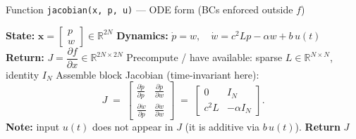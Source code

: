 \documentclass[11pt]{article}
\begin{document}
\begin{algorithm}[h]
\caption{Function \texttt{jacobian(x, p, u)} — ODE form (BCs enforced outside $f$)}
\begin{algorithmic}[1]
\State \textbf{State:} $\mathbf{x}=\begin{bmatrix}p\\ w\end{bmatrix}\in\mathbb{R}^{2N}$ \quad
\textbf{Dynamics:}\quad
$\dot p = w,\quad \dot w = c^2 L p - \alpha w + b\,u(t)$
\State \textbf{Return:} $J=\dfrac{\partial f}{\partial x}\in\mathbb{R}^{2N\times 2N}$
\vspace{4pt}
\State Precompute / have available: sparse $L\in\mathbb{R}^{N\times N}$, identity $I_N$
\State Assemble block Jacobian (time-invariant here):
\[
J \;=\;
\begin{bmatrix}
\frac{\partial \dot p}{\partial p} & \frac{\partial \dot p}{\partial w}\\[2pt]
\frac{\partial \dot w}{\partial p} & \frac{\partial \dot w}{\partial w}
\end{bmatrix}
\;=\;
\begin{bmatrix}
0 & I_N\\[2pt]
c^2 L & -\alpha I_N
\end{bmatrix}.
\]
\State \textbf{Note:} input $u(t)$ does not appear in $J$ (it is additive via $b\,u(t)$).
\State \textbf{Return} $J$
\end{algorithmic}
\end{algorithm}
\end{document}
